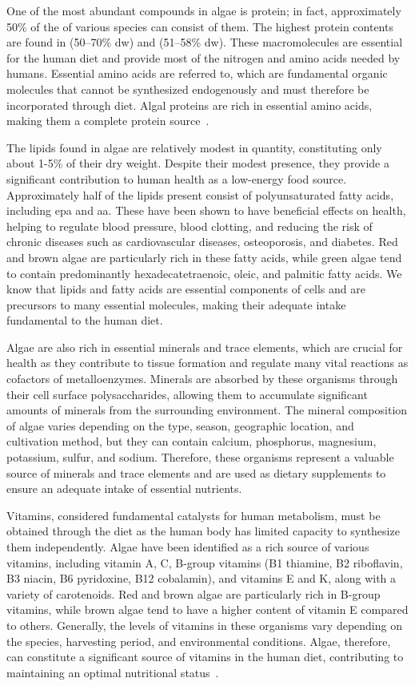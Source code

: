 One of the most abundant compounds in algae is protein; in fact, approximately 50\% of the  of various species can consist of them. The highest protein contents are found in  (50–70\% dw) and  (51–58\% dw). These macromolecules are essential for the human diet and provide most of the nitrogen and amino acids needed by humans. Essential amino acids are referred to, which are fundamental organic molecules that cannot be synthesized endogenously and must therefore be incorporated through diet. Algal proteins are rich in essential amino acids, making them a complete protein source~\parencite{torres-tiji_Microalgae_2020}.

The lipids found in algae are relatively modest in quantity, constituting only about 1-5\% of their dry weight. Despite their modest presence, they provide a significant contribution to human health as a low-energy food source. Approximately half of the lipids present consist of polyunsaturated fatty acids, including \gls{epa} and \gls{aa}. These have been shown to have beneficial effects on health, helping to regulate blood pressure, blood clotting, and reducing the risk of chronic diseases such as cardiovascular diseases, osteoporosis, and diabetes. Red and brown algae are particularly rich in these fatty acids, while green algae tend to contain predominantly hexadecatetraenoic, oleic, and palmitic fatty acids. We know that lipids and fatty acids are essential components of cells and are precursors to many essential molecules, making their adequate intake fundamental to the human diet.

Algae are also rich in essential minerals and trace elements, which are crucial for health as they contribute to tissue formation and regulate many vital reactions as cofactors of metalloenzymes. Minerals are absorbed by these organisms through their cell surface polysaccharides, allowing them to accumulate significant amounts of minerals from the surrounding environment. The mineral composition of algae varies depending on the type, season, geographic location, and cultivation method, but they can contain calcium, phosphorus, magnesium, potassium, sulfur, and sodium. Therefore, these organisms represent a valuable source of minerals and trace elements and are used as dietary supplements to ensure an adequate intake of essential nutrients.

Vitamins, considered fundamental catalysts for human metabolism, must be obtained through the diet as the human body has limited capacity to synthesize them independently. Algae have been identified as a rich source of various vitamins, including vitamin A, C, B-group vitamins (B1 thiamine, B2 riboflavin, B3 niacin, B6 pyridoxine, B12 cobalamin), and vitamins E and K, along with a variety of carotenoids. Red and brown algae are particularly rich in B-group vitamins, while brown algae tend to have a higher content of vitamin E compared to others. Generally, the levels of vitamins in these organisms vary depending on the species, harvesting period, and environmental conditions. Algae, therefore, can constitute a significant source of vitamins in the human diet, contributing to maintaining an optimal nutritional status~\parencite{tiwari_Seaweed_2015}.

